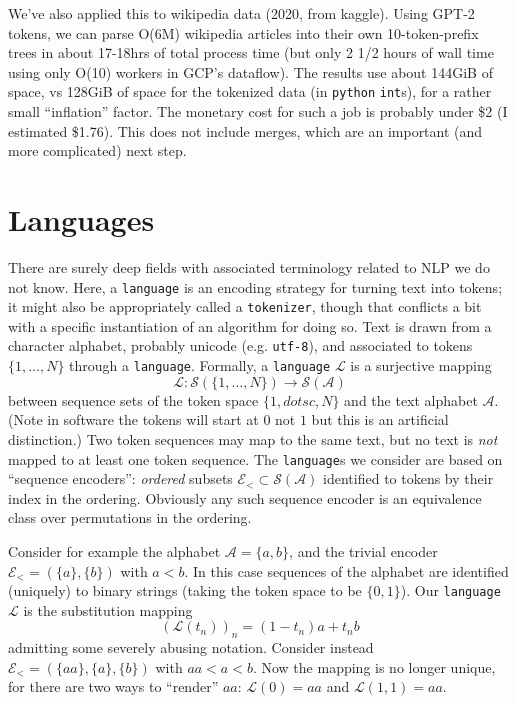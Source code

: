\documentclass[11pt, oneside]{amsart}   	%
\begin{document}
We've also applied this to wikipedia data (2020, from kaggle). Using GPT-2 tokens, we can parse O(6M) wikipedia articles into their own 10-token-prefix trees in about 17-18hrs of total process time (but only 2 1/2 hours of wall time using only O(10) workers in GCP's dataflow). The results use about 144GiB of space, vs 128GiB of space for the tokenized data (in \texttt{python} \texttt{int}s), for a rather small ``inflation'' factor. The monetary cost for such a job is probably under \$2 (I estimated \$1.76). This does not include merges, which are an important (and more complicated) next step. 

\section{Languages}

There are surely deep fields with associated terminology related to NLP we do not know. Here, a \texttt{language} is an encoding strategy for turning text into tokens; it might also be appropriately called a \texttt{tokenizer}, though that conflicts a bit with a specific instantiation of an algorithm for doing so. Text is drawn from a character alphabet, probably unicode (e.g. \texttt{utf-8}), and associated to tokens $\{1,\dotsc,N\}$ through a \texttt{language}. Formally, a \texttt{language} $\mathcal{L}$ is a surjective mapping
\begin{equation*}
	\mathcal{L} : \mathcal{S}(\{1,\dotsc,N\}) \to \mathcal{S}(\mathcal{A})
\end{equation*}
between sequence sets of the token space $\{1,dotsc,N\}$ and the text alphabet $\mathcal{A}$. (Note in software the tokens will start at $0$ not $1$ but this is an artificial distinction.) Two token sequences may map to the same text, but no text is {\em not} mapped to at least one token sequence. The \texttt{language}s we consider are based on ``sequence encoders'': {\em ordered} subsets $\mathcal{E}_{<} \subset \mathcal{S}(\mathcal{A})$ identified to tokens by their index in the ordering. Obviously any such sequence encoder is an equivalence class over permutations in the ordering. 

Consider for example the alphabet $\mathcal{A} = \{a, b\}$, and the trivial encoder $\mathcal{E}_{<} = (\{a\},\{b\})$ with $a < b$. In this case sequences of the alphabet are identified (uniquely) to binary strings (taking the token space to be $\{0,1\}$). Our \texttt{language} $\mathcal{L}$ is the substitution mapping
\begin{equation*}
	(\mathcal{L}(t_n))_n = (1-t_n)a + t_nb
\end{equation*}
admitting some severely abusing notation. Consider instead $\mathcal{E}_{<} = (\{aa\},\{a\},\{b\})$ with $aa < a < b$. Now the mapping is no longer unique, for there are two ways to ``render'' $aa$: $\mathcal{L}(0) = aa$ and $\mathcal{L}(1,1) = aa$. 
\end{document}
